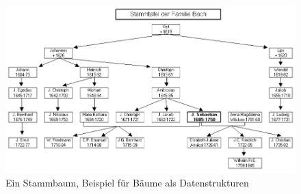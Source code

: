 \begin{figure}[h]
    \centering
    \includegraphics[scale=0.7]{abbildungen/Stammbaum.png}
    \caption{Ein Stammbaum, Beispiel für Bäume als Datenstrukturen \cite[S. 2]{q4}}
    \label{pic:stammbaum}
\end{figure}
